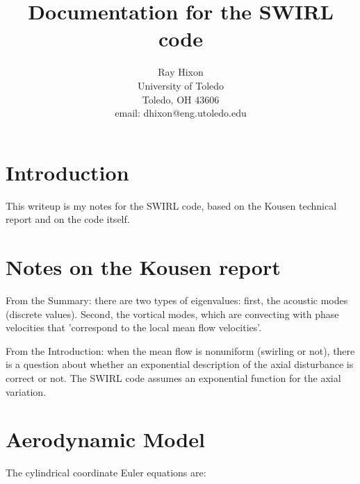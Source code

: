 \documentclass[12pt]{article}
\begin{document}
\begin{titlepage}
\title{
Documentation for the SWIRL code}


\author{
Ray Hixon \\
University of Toledo \\
Toledo, OH  43606 \\
email:  dhixon@eng.utoledo.edu}

\maketitle

\end{titlepage}

\section{Introduction}

This writeup is my notes for the SWIRL code, based on the Kousen technical report and
on the code itself.

\section{Notes on the Kousen report}

From the Summary:  there are two types of eigenvalues:  first, the acoustic modes (discrete values).
Second, the vortical modes, which are convecting with phase velocities that 'correspond to the
local mean flow velocities'.

From the Introduction:  when the mean flow is nonuniform (swirling or not), there is a question
about whether an exponential description of the axial disturbance is correct or not.  The
SWIRL code assumes an exponential function for the axial variation.

\section{Aerodynamic Model}

The cylindrical coordinate Euler equations are:
\end{document}
